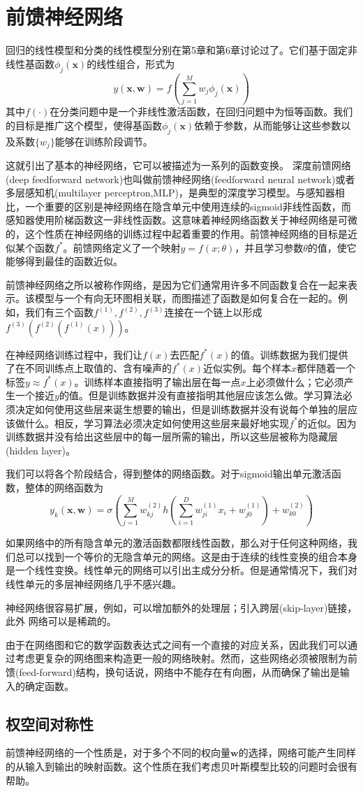 \section{前馈神经网络}
回归的线性模型和分类的线性模型分别在第5章和第6章讨论过了。它们基于固定非线性基函数$\phi_j(\boldsymbol{x})$的线性组合，形式为
\begin{equation}	y(\boldsymbol{x},\boldsymbol{w})=f\left(\sum_{j=1}^{M}w_j\phi_j(\boldsymbol{x}) \right)
\end{equation}
其中$f(\cdot)$在分类问题中是一个非线性激活函数，在回归问题中为恒等函数。我们的目标是推广这个模型，使得基函数$\phi_j(\boldsymbol{x})$依赖于参数，从而能够让这些参数以及系数$\{w_j\}$能够在训练阶段调节。

这就引出了基本的神经网络，它可以被描述为一系列的函数变换。
深度前馈网络(deep feedforward network)也叫做前馈神经网络(feedforward neural network)或者多层感知机(multilayer perceptron,MLP)，是典型的深度学习模型。与感知器相比，一个重要的区别是神经网络在隐含单元中使用连续的sigmoid非线性函数，而感知器使用阶梯函数这一非线性函数。这意味着神经网络函数关于神经网络是可微的，这个性质在神经网络的训练过程中起着重要的作用。前馈神经网络的目标是近似某个函数$f^*$。前馈网络定义了一个映射$y=f(x;\theta)$，并且学习参数$\theta$的值，使它能够得到最佳的函数近似。

前馈神经网络之所以被称作网络，是因为它们通常用许多不同函数复合在一起来表示。该模型与一个有向无环图相关联，而图描述了函数是如何复合在一起的。例如，我们有三个函数$f^{(1)},f^{(2)},f^{(3)}$连接在一个链上以形成$f^{(3)}(f^{(2)}(f^{(1)}(x)))$。

在神经网络训练过程中，我们让$f(x)$去匹配$f^*(x)$的值。训练数据为我们提供了在不同训练点上取值的、含有噪声的$f^*(x)$近似实例。每个样本$x$都伴随着一个标签$y\approx f^*(x)$。训练样本直接指明了输出层在每一点$x$上必须做什么；它必须产生一个接近$y$的值。但是训练数据并没有直接指明其他层应该怎么做。学习算法必须决定如何使用这些层来诞生想要的输出，但是训练数据并没有说每个单独的层应该做什么。相反，学习算法必须决定如何使用这些层来最好地实现$f^*$的近似。因为训练数据并没有给出这些层中的每一层所需的输出，所以这些层被称为隐藏层(hidden layer)。

我们可以将各个阶段结合，得到整体的网络函数。对于sigmoid输出单元激活函数，整体的网络函数为
\begin{equation}
	y_k(\boldsymbol{x},\boldsymbol{w})=\sigma\left( \sum_{j=1}^{M}w_{kj}^{(2)}h\left( \sum_{i=1}^{D}w_{ji}^{(1)}x_i+w_{j0}^{(1)}  \right)+w_{k0}^{(2)} \right)
\end{equation}

如果网络中的所有隐含单元的激活函数都限线性函数，那么对于任何这种网络，我们总可以找到一个等价的无隐含单元的网络。这是由于连续的线性变换的组合本身是一个线性变换。线性单元的网络可以引出主成分分析。但是通常情况下，我们对线性单元的多层神经网络几乎不感兴趣。

神经网络很容易扩展，例如，可以增加额外的处理层；引入跨层(skip-layer)链接，此外 网络可以是稀疏的。

由于在网络图和它的数学函数表达式之间有一个直接的对应关系，因此我们可以通过考虑更复杂的网络图来构造更一般的网络映射。然而，这些网络必须被限制为前馈(feed-forward)结构，换句话说，网络中不能存在有向圈，从而确保了输出是输入的确定函数。
\subsection*{权空间对称性}
前馈神经网络的一个性质是，对于多个不同的权向量$\boldsymbol{w}$的选择，网络可能产生同样的从输入到输出的映射函数。这个性质在我们考虑贝叶斯模型比较的问题时会很有帮助。
